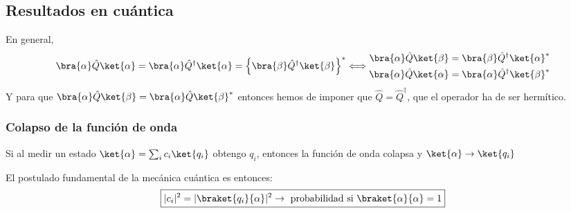 \documentclass{report}
\begin{document}
    \subsection{Resultados en cuántica}

      \noindent En general, \[\bra{\alpha}\hat{Q}\ket{\alpha}=\bra{\alpha}\hat{Q}^\dagger\ket{\alpha}=
      \left\{\bra{\beta}\hat{Q}^\dagger\ket{\beta}\right\}^*\Longleftrightarrow
      \begin{aligned}
        \bra{\alpha}\hat{Q}\ket{\beta}=\bra{\beta}\hat{Q}^\dagger\ket{\alpha}^*\\
        \bra{\alpha}\hat{Q}\ket{\alpha}=\bra{\alpha}\hat{Q}^\dagger\ket{\beta}^*
      \end{aligned}\]
      \noindent Y para que $\bra{\alpha}\hat{Q}\ket{\beta}=\bra{\alpha}\hat{Q}\ket{\beta}^*$ entonces hemos de 
      imponer que $\hat{Q}=\hat{Q}^\dagger$, que el operador ha de ser hermítico.

      \subsubsection{Colapso de la función de onda}
        \noindent Si al medir un estado $\ket{\alpha}=\sum_i c_i\ket{q_i}$ obtengo $q_i$, entonces
        la función de onda colapsa y $\ket{\alpha}\rightarrow\ket{q_i}$
        
        \noindent El postulado fundamental de la mecánica cuántica es entonces:
        \[\boxed{\abs{c_i}^2=\abs{\braket{q_i}{\alpha}}^2\rightarrow\text{ probabilidad si }\braket{\alpha}{\alpha}= 1}\]
\end{document}
